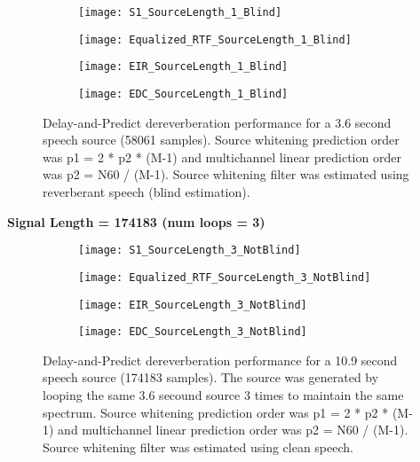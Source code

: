 \begin{figure}[H]
	\centering
	\begin{subfigure}[b]{0.49\textwidth}
		\centering
		\texttt{[image: S1\_SourceLength\_1\_Blind]}
	\end{subfigure}
	\hfill
	\begin{subfigure}[b]{0.49\textwidth}
		\centering
		\texttt{[image: Equalized\_RTF\_SourceLength\_1\_Blind]}
	\end{subfigure}
	\hfill
	\begin{subfigure}[b]{0.49\textwidth}
		\centering
		\texttt{[image: EIR\_SourceLength\_1\_Blind]}
	\end{subfigure}
	\hfill
	\begin{subfigure}[b]{0.49\textwidth}
		\centering
		\texttt{[image: EDC\_SourceLength\_1\_Blind]}
	\end{subfigure}
	\hfill
	\caption{Delay-and-Predict dereverberation performance for a 3.6 second speech source (58061 samples). Source whitening prediction order was p1 = 2 * p2 * (M-1) and multichannel linear prediction order was p2 = N60 / (M-1). Source whitening filter was estimated using reverberant speech (blind estimation).}
	\label{fig:params_source_length_1_blind}
\end{figure}



\textbf{Signal Length = 174183 (num loops = 3)}

\begin{figure}[H]
	\centering
	\begin{subfigure}[b]{0.49\textwidth}
		\centering
		\texttt{[image: S1\_SourceLength\_3\_NotBlind]}
	\end{subfigure}
	\hfill
	\begin{subfigure}[b]{0.49\textwidth}
		\centering
		\texttt{[image: Equalized\_RTF\_SourceLength\_3\_NotBlind]}
	\end{subfigure}
	\hfill
	\begin{subfigure}[b]{0.49\textwidth}
		\centering
		\texttt{[image: EIR\_SourceLength\_3\_NotBlind]}
	\end{subfigure}
	\hfill
	\begin{subfigure}[b]{0.49\textwidth}
		\centering
		\texttt{[image: EDC\_SourceLength\_3\_NotBlind]}
	\end{subfigure}
	\hfill
	\caption{Delay-and-Predict dereverberation performance for a 10.9 second speech source (174183 samples). The source was generated by looping the same 3.6 secound source 3 times to maintain the same spectrum. Source whitening prediction order was p1 = 2 * p2 * (M-1) and multichannel linear prediction order was p2 = N60 / (M-1). Source whitening filter was estimated using clean speech.}
	\label{fig:params_source_length_3_not_blind}
\end{figure}

